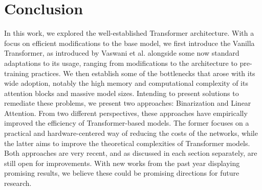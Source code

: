 \section{Conclusion}

In this work, we explored the well-established Transformer architecture. With a focus on efficient modifications to the base model, we first introduce the Vanilla Transformer, as introduced by Vaswani et al. alongside some now standard adaptations to its usage, ranging from modifications to the architecture to pre-training practices. We then establish some of the bottlenecks that arose with its wide adoption, notably the high memory and computational complexity of its attention blocks and massive model sizes. Intending to present solutions to remediate these problems, we present two approaches: Binarization and Linear Attention. From two different perspectives, these approaches have empirically improved the efficiency of Transformer-based models. The former focuses on a practical and hardware-centered way of reducing the costs of the networks, while the latter aims to improve the theoretical complexities of Transformer models. Both approaches are very recent, and as discussed in each section separately, are still open for improvements. With new works from the past year displaying promising results, we believe these could be promising directions for future research.